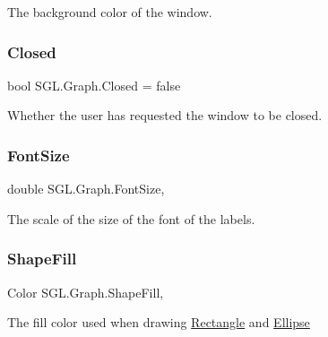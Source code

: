 The background color of the window. 

\mbox{\label{class_s_g_l_1_1_graph_af02de749db6b6d1988e22dc598661def}} 
\subsubsection{\texorpdfstring{Closed}{Closed}}
{\footnotesize\ttfamily bool S\+G\+L.\+Graph.\+Closed = false\hspace{0.3cm}{\ttfamily [get]}}



Whether the user has requested the window to be closed. 

\mbox{\label{class_s_g_l_1_1_graph_a466dbe496c87ac50283ee68af38ec98f}} 
\subsubsection{\texorpdfstring{Font\+Size}{FontSize}}
{\footnotesize\ttfamily double S\+G\+L.\+Graph.\+Font\+Size\hspace{0.3cm}{\ttfamily [get]}, {\ttfamily [set]}}



The scale of the size of the font of the labels. 

\mbox{\label{class_s_g_l_1_1_graph_a14469c5ae5d52e1eec659f6800a36c37}} 
\subsubsection{\texorpdfstring{Shape\+Fill}{ShapeFill}}
{\footnotesize\ttfamily Color S\+G\+L.\+Graph.\+Shape\+Fill\hspace{0.3cm}{\ttfamily [get]}, {\ttfamily [set]}}



The fill color used when drawing \mbox{\hyperlink{class_s_g_l_1_1_rectangle}{Rectangle}} and \mbox{\hyperlink{class_s_g_l_1_1_ellipse}{Ellipse}} 

